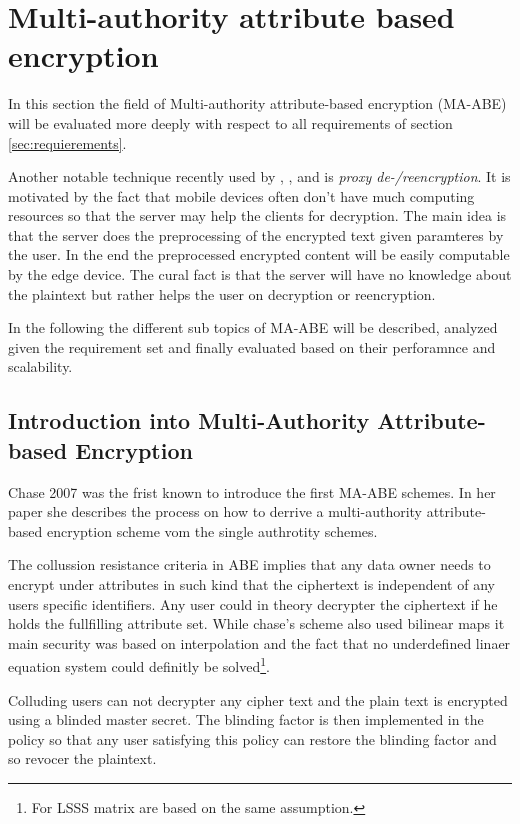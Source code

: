 \section{Multi-authority attribute based encryption}
In this section the field of Multi-authority attribute-based encryption (MA-ABE) will be evaluated more deeply with respect to all requirements of section \ref{sec:requierements}. 

Another notable technique recently used by \cite{yang2013dac}, \cite{wu2017security}, \cite{li2017two} and \cite{wang2011hierarchical} is \textit{proxy de-/reencryption}. It is motivated by the fact that mobile devices often don't have much computing resources so that the server may help the clients for decryption. The main idea is that the server does the preprocessing of the encrypted text given paramteres by the user. In the end the preprocessed encrypted content will be easily computable by the edge device. The cural fact is that the server will have no knowledge about the plaintext but rather helps the user on decryption or reencryption. 

In the following the different sub topics of MA-ABE will be described, analyzed given the requirement set and finally evaluated based on their perforamnce and scalability. 

\subsection{Introduction into Multi-Authority Attribute-based Encryption}
Chase 2007 \cite{chase2007multi} was the frist known to introduce the first MA-ABE schemes. In her paper she describes the process on how to derrive a multi-authority attribute-based encryption scheme vom the single authrotity schemes. 

The collussion resistance criteria in ABE implies that any data owner needs to encrypt under attributes in such kind that the ciphertext is independent of any users specific identifiers. Any user could in theory decrypter the ciphertext if he holds the fullfilling attribute set. While chase's scheme also used bilinear maps it main security was based on interpolation and the fact that no underdefined linaer equation system could definitly be solved\footnote{For LSSS matrix are based on the same assumption.}.  

Colluding users can not decrypter any cipher text and the plain text is encrypted using a blinded master secret. The blinding factor is then implemented in the policy so that any user satisfying this policy can restore the blinding factor and so revocer the plaintext. 

